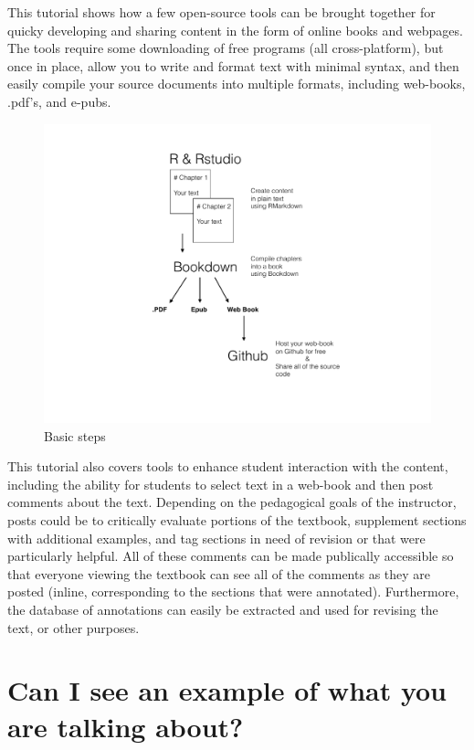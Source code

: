 \documentclass[]{book}
\theoremstyle{definition}
\theoremstyle{definition}
\theoremstyle{definition}
\theoremstyle{remark}
\begin{document}
This tutorial shows how a few open-source tools can be brought together
for quicky developing and sharing content in the form of online books
and webpages. The tools require some downloading of free programs (all
cross-platform), but once in place, allow you to write and format text
with minimal syntax, and then easily compile your source documents into
multiple formats, including web-books, .pdf's, and e-pubs.

\begin{figure}[htbp]
\centering
\includegraphics{Figures/OERTutorial_Overview.pdf}
\caption{\label{fig:fig1}Basic steps}
\end{figure}

This tutorial also covers tools to enhance student interaction with the
content, including the ability for students to select text in a web-book
and then post comments about the text. Depending on the pedagogical
goals of the instructor, posts could be to critically evaluate portions
of the textbook, supplement sections with additional examples, and tag
sections in need of revision or that were particularly helpful. All of
these comments can be made publically accessible so that everyone
viewing the textbook can see all of the comments as they are posted
(inline, corresponding to the sections that were annotated).
Furthermore, the database of annotations can easily be extracted and
used for revising the text, or other purposes.

\section{Can I see an example of what you are talking
about?}\label{can-i-see-an-example-of-what-you-are-talking-about}
\end{document}
